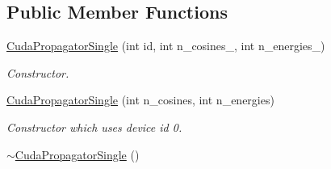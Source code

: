 \subsection*{Public Member Functions}
\begin{DoxyCompactItemize}
\item 
\hyperlink{classcudaprob3_1_1CudaPropagatorSingle_afdf1133d44933fee8ce26c7f7287a089}{Cuda\+Propagator\+Single} (int id, int n\+\_\+cosines\+\_\+, int n\+\_\+energies\+\_\+)
\begin{DoxyCompactList}\small\item\em Constructor. \end{DoxyCompactList}\item 
\hyperlink{classcudaprob3_1_1CudaPropagatorSingle_a367c4f257905344c3fa7ae50507e5942}{Cuda\+Propagator\+Single} (int n\+\_\+cosines, int n\+\_\+energies)
\begin{DoxyCompactList}\small\item\em Constructor which uses device id 0. \end{DoxyCompactList}\item 
\hyperlink{classcudaprob3_1_1CudaPropagatorSingle_ac779c663d73e1c2a0ac6b10d770ac0a4}{$\sim$\+Cuda\+Propagator\+Single} ()\hypertarget{classcudaprob3_1_1CudaPropagatorSingle_ac779c663d73e1c2a0ac6b10d770ac0a4}{}\label{classcudaprob3_1_1CudaPropagatorSingle_ac779c663d73e1c2a0ac6b10d770ac0a4}


\end{DoxyCompactItemize}
